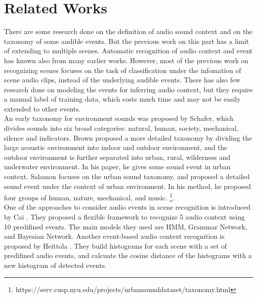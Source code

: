 \chapter{Related Works}
There are some research done on the definition of audio sound context and on the taxonomy of some audible events. 
But the previous work on this part has a limit of extending to multiple scenes. 
Automatic recognition of audio context and event has known also from many earlier works. 
However, most of the previous work on recognizing scenes focuses on the task of classification under the infomation of scene audio clips, instead of the underlying audible events. 
There has also few research done on modeling the events for inferring audio context, but they require a manual label of training data, which costs much time and may not be easily extended to other events. \\ 

An early taxonomy for environment sounds was proposed by Schafer\parencite{schafer1993soundscape}, which divides sounds into six broad categories: natural, human, society, mechanical, silence and indicators. 
Brown\parencite{brown2011towards} proposed a more detailed taxonomy by dividing the large acoustic environment into indoor and outdoor environment, and the outdoor environment is further separated into urban, rural, wilderness and underwater environment. 
In his paper, he gives some sound event in urban context.
Salamon\parencite{salamon2014dataset} focuses on the urban sound taxonomy, and proposed a detailed sound event under the context of urban environment. 
In his method, he proposed four groups of human, nature, mechanical, and music. \footnote{https://serv.cusp.nyu.edu/projects/urbansounddataset/taxonomy.html}. \\ 

One of the approaches to consider audio events in scene recognition is introduced by Cai  \parencite{cai2006flexible}. 
They proposed a flexible framework to recognize 5 audio context using 10 predifined events. 
The main models they used are HMM, Grammar Network, and Bayesian Network. 
Another event-based audio context recognition is proposed by Heittola \parencite{heittola2010audio}. 
They build histograms for each scene with a set of predifined audio events, and calcuate the cosine distance of the histograms with a new histogram of detected events.\\


